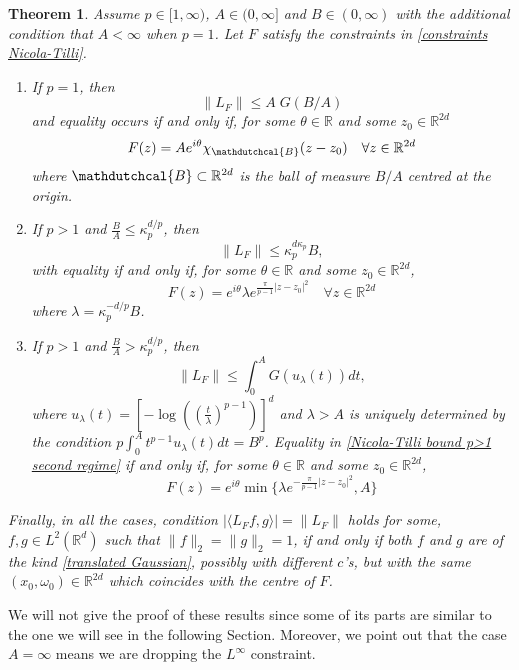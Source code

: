 \documentclass[corpo=11pt, stile=classica, tipotesi=custom,
greek, evenboxes, english]{toptesi}
\numberwithin{equation}{chapter}
\newtheorem{teo}{Theorem}[chapter] %
\newcommand{\R}{\mathbb{R}} %
\begin{document}
\begin{teo}\label{Nicola Tilli norm theorem}
	Assume $p \in [1,\infty)$, $A \in (0, \infty]$ and $B \in (0,\infty)$ with the additional condition that $A < \infty$ when $p=1$. Let $F$ satisfy the constraints in \eqref{constraints Nicola-Tilli}.
	\begin{enumerate}[label=(\roman*)]
		\item If $p=1$, then
		\begin{equation}\label{Nicola-Tilli bound p=1}
			\|L_F\| \leq A\;G(B/A)
		\end{equation}
		and equality occurs if and only if, for some $\theta \in \R$ and some $z_0 \in \R^{2d}$
		\begin{equation}\label{Nicola-Tilli maximal function p=1}
			F(z) = A e^{i\theta} \chi_{\mathdutchcal{B}} (z-z_0) \quad \forall z \in \R^{2d}
		\end{equation}
		where $\mathdutchcal{B} \subset \R^{2d}$ is the ball of measure $B/A$ centred at the origin.
		
		\item If $p>1$ and $\frac{B}{A} \leq \kappa_p^{d/p}$, then
		\begin{equation}\label{Nicola-Tilli bound p>1 first regime}
			\|L_F\| \leq \kappa_p^{d \kappa_p}B,
		\end{equation}
		with equality if and only if, for some $\theta \in \R$ and some $z_0 \in \R^{2d}$,
		\begin{equation}\label{Nicola-Tilli maximal function p>1 first regime}
			F(z) = e^{i \theta} \lambda e^{\frac{\pi}{p-1}|z-z_0|^2} \quad \forall z \in \R^{2d}
		\end{equation}
		where $\lambda = \kappa_p^{-d/p}B$.\label{Nicola-Tilli norm theorem case 2}	
		\item If $p>1$ and $\frac{B}{A} > \kappa_p^{d/p}$, then
		\begin{equation}\label{Nicola-Tilli bound p>1 second regime}
			\|L_F\| \leq \int_{0}^{A} G(u_{\lambda}(t))dt,
		\end{equation}
		where $u_{\lambda}(t) = \left[-\log\left(\left(\frac{t}{\lambda}\right)^{p-1}\right) \right]^d$ and $\lambda>A$ is uniquely determined by the condition $p\int_{0}^{A} t^{p-1}u_{\lambda}(t)dt = B^p$. Equality in \eqref{Nicola-Tilli bound p>1 second regime} if and only if, for some $\theta \in \R$ and some $z_0 \in \R^{2d}$,
		\begin{equation}\label{Nicola-Tilli maximal function p>1 second regime}
			F(z) = e^{i\theta} \min \{ \lambda e^{-\frac{\pi}{p-1}|z-z_0|^2}, A \}
		\end{equation}
	\end{enumerate}
	Finally, in all the cases, condition $|\langle L_F f,g \rangle| = \|L_F\|$ holds for some, $f,g \in L^2(\R^d)$ such that $\|f\|_2 = \|g\|_2 = 1$, if and only if both $f$ and $g$ are of the kind \eqref{translated Gaussian}, possibly with different $c$'s, but with the same $(x_0,\omega_0) \in \R^{2d}$ which coincides with the centre of $F$.
\end{teo}
We will not give the proof of these results since some of its parts are similar to the one we will see in the following Section. Moreover, we point out that the case $A=
\infty$ means we are dropping the $L^{\infty}$ constraint.
\end{document}
